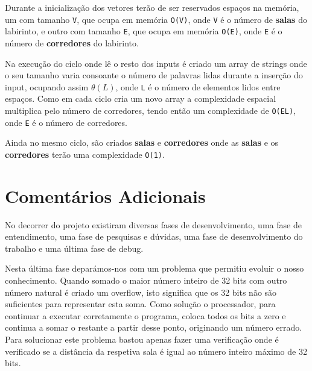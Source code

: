 \documentclass[11pt]{article}
\begin{document}
Durante a inicialização dos vetores terão de ser reservados espaços na memória,
um com tamanho \verb|V|, que ocupa em memória \verb|O(V)|, onde \verb|V| é o número de
\textbf{salas} do labirinto, e outro com tamanho \verb|E|, que ocupa em memória \verb|O(E)|,
onde \verb|E| é o número de \textbf{corredores} do labirinto.

Na execução do ciclo onde lê o resto dos inputs é criado um array de strings onde o seu tamanho
varia consoante o número de palavras lidas durante a inserção do input, ocupando assim $\theta(L)$,
onde \verb|L| é o número de elementos lidos entre espaços. Como em cada ciclo cria um novo array
a complexidade espacial multiplica pelo número de corredores, tendo então um complexidade de
\verb|O(EL)|, onde \verb|E| é o número de corredores.

Ainda no mesmo ciclo, são criados \textbf{salas} e \textbf{corredores} onde as \textbf{salas} e os
\textbf{corredores} terão uma complexidade \verb|O(1)|. 
\section{Comentários Adicionais}

\hspace{0,5cm}No decorrer do projeto existiram diversas fases de desenvolvimento, uma fase 
de entendimento, uma fase de pesquisas e dúvidas, uma fase de desenvolvimento do trabalho e
uma última fase de debug.

Nesta última fase deparámos-nos com um problema que permitiu evoluir
o nosso conhecimento. Quando somado o maior número inteiro de 32 bits com outro número natural
é criado um overflow, isto significa que os 32 bits não são suficientes para representar esta
soma. Como solução o processador, para continuar a executar corretamente o programa, coloca
todos os bits a zero e continua a somar o restante a partir desse ponto, originando um número
errado. Para solucionar este problema bastou apenas fazer uma verificação onde é
verificado se a distância da respetiva sala é igual ao número inteiro máximo de 32 bits. 
\end{document}
